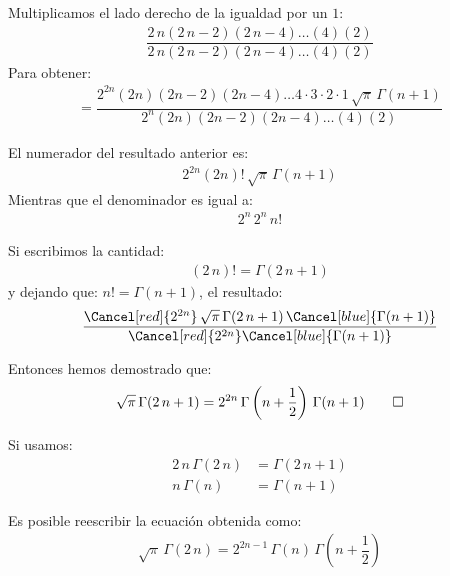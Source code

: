 Multiplicamos el lado derecho de la igualdad por un $1$:
\begin{align*}
\dfrac{2 \, n (2 \, n - 2)(2 \, n - 4) \ldots (4)(2)}{2 \, n (2 \, n - 2)(2 \, n - 4) \ldots (4)(2)}
\end{align*}
Para obtener:
\begin{align*}
= \dfrac{2^{2n} (2 n) (2 n {-} 2)(2 n {-} 4) \ldots 4 \cdot 3 \cdot 2 \cdot 1 \, \sqrt{\pi} \, \Gamma(n {+} 1)}{2^{n} (2 n)(2 n {-} 2)(2 n {-} 4) \ldots (4) (2)}
\end{align*}


El numerador del resultado anterior es:
\begin{align*}
2^{2n} (2 n)! \, \sqrt{\pi} \, \Gamma(n + 1)
\end{align*}
Mientras que el denominador es igual a:
\begin{align*}
2^{n} \, 2^{n} \, n!
\end{align*}

Si escribimos la cantidad:
\begin{align*}
(2 \, n)! = \Gamma(2 \, n + 1)
\end{align*}
y dejando que: $n! = \Gamma(n + 1)$, el resultado:
\begin{align*}
\dfrac{\Cancel[red]{2^{2n}} \, \sqrt{\pi} \, \Gamma(2 \, n + 1) \, \Cancel[blue]{\Gamma(n + 1)}}{\Cancel[red]{2^{2n}} \Cancel[blue]{\Gamma(n + 1)}}
\end{align*}

Entonces hemos demostrado que:
\begin{align*}
\sqrt{\pi} \, \Gamma(2 \, n + 1) = 2^{2n} \, \Gamma \left( n + \dfrac{1}{2} \right) \, \Gamma(n + 1) \qed
\end{align*}    

Si usamos:
\begin{align*}
2 \, n \, \Gamma( 2 \, n) &= \Gamma(2 \, n + 1) \\[0.5em] 
n \, \Gamma(n) &= \Gamma(n + 1)
\end{align*}

Es posible reescribir la ecuación obtenida como:
\begin{align*}
\sqrt{\pi} \, \Gamma(2 \, n) = 2^{2n-1} \, \Gamma(n) \, \Gamma \left( n + \dfrac{1}{2} \right)
\end{align*}


